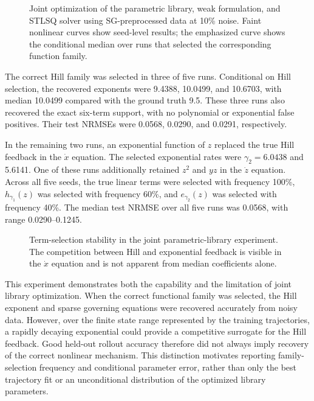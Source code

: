\begin{figure}[t]
    \centering
    \caption{Joint optimization of the parametric library, weak formulation,
    and STLSQ solver using SG-preprocessed data at 10\% noise.  Faint nonlinear
    curves show seed-level results; the emphasized curve shows the conditional
    median over runs that selected the corresponding function family.}
    \label{fig:goodwin-parametric-library}
\end{figure}

The correct Hill family was selected in three of five runs.  Conditional on
Hill selection, the recovered exponents were 9.4388, 10.0499, and 10.6703,
with median 10.0499 compared with the ground truth 9.5.  These three runs also
recovered the exact six-term support, with no polynomial or exponential false
positives.  Their test NRMSEs were 0.0568, 0.0290, and 0.0291, respectively.

In the remaining two runs, an exponential function of $z$ replaced the true
Hill feedback in the $\dot x$ equation.  The selected exponential rates were
$\gamma_2=6.0438$ and 5.6141.  One of these runs additionally retained
$z^2$ and $yz$ in the $\dot z$ equation.  Across all five seeds, the true
linear terms were selected with frequency 100\%, $h_{\gamma_1}(z)$ was
selected with frequency 60\%, and $e_{\gamma_2}(z)$ was selected with
frequency 40\%.  The median test NRMSE over all five runs was 0.0568, with
range 0.0290--0.1245.

\begin{figure}[t]
    \centering
    \caption{Term-selection stability in the joint parametric-library
    experiment.  The competition between Hill and exponential feedback is
    visible in the $\dot x$ equation and is not apparent from median
    coefficients alone.}
    \label{fig:goodwin-parametric-support}
\end{figure}

This experiment demonstrates both the capability and the limitation of joint
library optimization.  When the correct functional family was selected, the
Hill exponent and sparse governing equations were recovered accurately from
noisy data.  However, over the finite state range represented by the training
trajectories, a rapidly decaying exponential could provide a competitive
surrogate for the Hill feedback.  Good held-out rollout accuracy therefore did
not always imply recovery of the correct nonlinear mechanism.  This distinction
motivates reporting family-selection frequency and conditional parameter error,
rather than only the best trajectory fit or an unconditional distribution of
the optimized library parameters.
